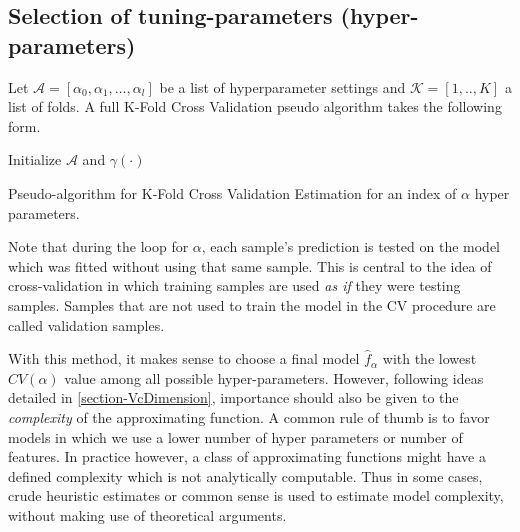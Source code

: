 \subsection{Selection of tuning-parameters (hyper-parameters) }\label{subsection:selection_hyper_params}

 Let $\mathcal{A} = [\alpha_0, \alpha_1,\ldots, \alpha_l  ]$ be a list of hyperparameter settings and $\mathcal{K} =[1,..,K]$ a list of folds.
A full K-Fold Cross Validation pseudo algorithm takes the following form.

 \begin{algorithm}[H]
 \SetAlgoLined{}
 Initialize $\mathcal{A}$ and $\gamma(\cdot)$\;
 \caption{Pseudo-algorithm for K-Fold Cross Validation Estimation for an index of $\alpha$ hyper parameters.}
 \end{algorithm}

Note that during the loop for $\alpha$, each sample's prediction is tested on the model which was fitted without using that same sample.
This is central to the idea of cross-validation in which training samples are used \textit{as if} they were testing samples.
Samples that are not used to train the model in the CV procedure are called validation samples.

With this method, it makes sense to choose a final model $\hat{f}_\alpha$ with the lowest $CV(\alpha)$ value among all possible hyper-parameters.
However, following ideas detailed in \cref{section-VcDimension}, importance should also be given to the \textit{complexity} of the approximating function.
A common rule of thumb is to favor models in which we use a lower number of hyper parameters or number of features.
In practice however, a class of approximating functions might have a defined complexity which is not analytically computable.
Thus in some cases, crude heuristic estimates or common sense is used to estimate model complexity, without making use of theoretical arguments.


